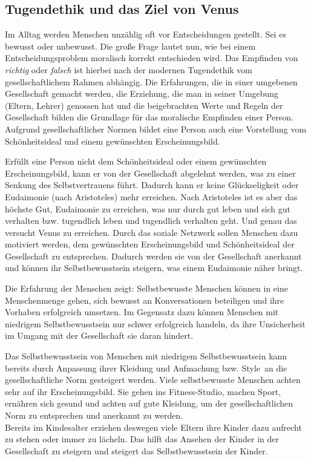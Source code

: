 \subsection{Tugendethik und das Ziel von Venus}
Im Alltag werden Menschen unzählig oft vor Entscheidungen gestellt. Sei es bewusst oder unbewusst. Die große Frage lautet nun, wie bei einem Entscheidungsproblem moralisch korrekt entschieden wird. Das Empfinden von \textit{richtig} oder \textit{falsch} ist hierbei nach der modernen Tugendethik vom gesellschaftlichem Rahmen abhängig. Die Erfahrungen, die in einer umgebenen Gesellschaft gemacht werden, die Erziehung, die man in seiner Umgebung (Eltern, Lehrer) genossen hat und die beigebrachten Werte und Regeln der Gesellschaft bilden die Grundlage für das moralische Empfinden einer Person. Aufgrund gesellschaftlicher Normen bildet eine Person auch eine Vorstellung vom Schönheitsideal und einem gewünschten Erscheinungsbild.

Erfüllt eine Person nicht dem Schönheitsideal oder einem gewünschten Erscheinungsbild, kann er von der Gesellschaft abgelehnt werden, was zu einer Senkung des Selbstvertrauens führt. Dadurch kann er keine Glückseligkeit oder Eudaimonie (nach Aristoteles) mehr erreichen. Nach Aristoteles ist es aber das höchste Gut, Eudaimonie zu erreichen, was nur durch gut leben und sich gut verhalten bzw. tugendlich leben und tugendlich verhalten geht. Und genau das versucht Venus zu erreichen. Durch das soziale Netzwerk sollen Menschen dazu motiviert werden, dem gewünschten Erscheinungsbild und Schönheitsideal der Gesellschaft zu entsprechen. Dadurch werden sie von der Gesellschaft anerkannt und können ihr Selbstbewusstsein steigern, was einem Eudaimonie näher bringt.

Die Erfahrung der Menschen zeigt: Selbstbewusste Menschen können in eine Menschenmenge gehen, sich bewusst an Konversationen beteiligen und ihre Vorhaben erfolgreich umsetzen. Im Gegensatz dazu können Menschen mit niedrigem Selbstbewusstsein nur schwer erfolgreich handeln, da ihre Unsicherheit im Umgang mit der Gesellschaft sie daran hindert.

Das Selbstbewusstsein von Menschen mit niedrigem Selbstbewusstsein kann bereits durch Anpassung ihrer Kleidung und Aufmachung bzw. \glqq Style\grqq~an die gesellschaftliche Norm gesteigert werden.
Viele selbstbewusste Menschen achten sehr auf ihr Erscheinungsbild. Sie gehen ins Fitness-Studio, machen Sport, ernähren sich gesund und achten auf gute Kleidung, um der gesellschaftlichen Norm zu entsprechen und anerkannt zu werden.\\
Bereits im Kindesalter erziehen deswegen viele Eltern ihre Kinder dazu aufrecht zu stehen oder immer zu lächeln. Das hilft das Ansehen der Kinder in der Gesellschaft zu steigern und steigert das Selbstbewusstsein der Kinder.

